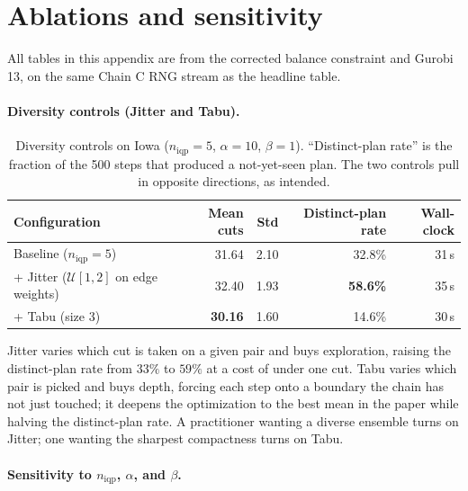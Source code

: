 \documentclass[11pt]{article}
\begin{document}
\section{Ablations and sensitivity}\label{sec:exp-ablations}



All tables in this appendix are from the corrected balance
constraint and Gurobi 13, on the same Chain C RNG stream as the
headline table.

\paragraph{Diversity controls (Jitter and Tabu).}\label{sec:exp-diversity}

\begin{table}[htbp]
\centering
\small
\begin{tabular}{lrrrr}
\toprule
Configuration & Mean cuts & Std & Distinct-plan rate & Wall-clock \\
\midrule
Baseline ($n_{\mathrm{iqp}} = 5$)               & 31.64 & 2.10 & 32.8\% & 31\,s \\
+ Jitter ($\mathcal{U}[1,2]$ on edge weights)   & 32.40 & 1.93 & \textbf{58.6\%} & 35\,s \\
+ Tabu (size 3)                                  & \textbf{30.16} & 1.60 & 14.6\% & 30\,s \\
\bottomrule
\end{tabular}
\caption{Diversity controls on Iowa ($n_{\mathrm{iqp}} = 5$,
  $\alpha = 10$, $\beta = 1$). ``Distinct-plan rate'' is the fraction
  of the 500 steps that produced a not-yet-seen plan. The two
  controls pull in opposite directions, as intended.}\label{tab:diversity-iowa}
\end{table}

Jitter varies which cut is taken on a given pair and buys exploration,
raising the distinct-plan rate from $33\%$ to $59\%$ at a cost of
under one cut. Tabu varies which pair is picked and buys depth,
forcing each step onto a boundary the chain has not just touched; it
deepens the optimization to the best mean in the paper while halving
the distinct-plan rate. A practitioner wanting a diverse ensemble
turns on Jitter; one wanting the sharpest compactness turns on Tabu.

\paragraph{Sensitivity to $n_{\mathrm{iqp}}$, $\alpha$, and $\beta$.}\label{sec:exp-sensitivity}
\end{document}
